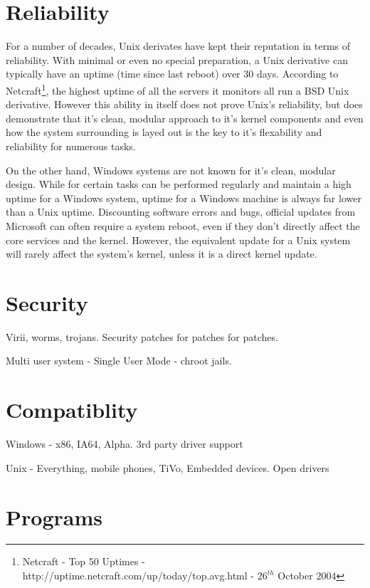 \documentclass[a4paper,10pt]{article}
\begin{document}
\section*{Reliability}

For a number of decades, Unix derivates have kept their reputation in
terms of reliability. With minimal or even no special preparation, a
Unix derivative can typically have an uptime (time since last reboot) 
over 30 days. According to Netcraft\footnote{Netcraft - Top 50 Uptimes 
-  http://uptime.netcraft.com/up/today/top.avg.html - $26^{th}$ October
$2004$}, the highest uptime of all the servers it monitors all run a BSD
Unix derivative. However this ability in itself does not prove Unix's
reliability, but does demonstrate that it's clean, modular approach to 
it's kernel components and even how the system surrounding is layed out 
is the key to it's flexability and reliability for numerous tasks.

On the other hand, Windows systems are not known for it's clean, modular
design. While for certain tasks can be performed regularly and maintain
a high uptime for a Windows system, uptime for a Windows machine is
always far lower than a Unix uptime. Discounting software errors and
bugs, official updates from Microsoft can often require a system reboot,
even if they don't directly affect the core services and the kernel.
However, the equivalent update for a Unix system will rarely affect the
system's kernel, unless it is a direct kernel update.

\section*{Security}

Virii, worms, trojans. Security patches for patches for patches.

Multi user system - Single User Mode - chroot jails.

\section*{Compatiblity}

Windows - x86, IA64, Alpha. 3rd party driver support

Unix - Everything, mobile phones, TiVo, Embedded devices. Open drivers

\section*{Programs}
\end{document}
